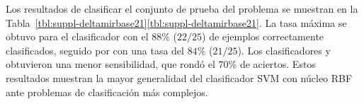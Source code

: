 %

Los resultados de clasificar el conjunto de prueba del problema
\prob\deltamirbase{} se muestran en la
\iflatexml{}Tabla~\ref{tbl:suppl-deltamirbase21}\else\autoref{tbl:suppl-deltamirbase21}\fi.
La tasa máxima se obtuvo para el clasificador  con el
$88\%$ ($22/25$) de ejemplos correctamente clasificados, seguido por
 con una tasa del $84\%$ ($21/25$).
Los clasificadores  y  obtuvieron una menor
sensibilidad, que rondó el $70\%$ de aciertos.
Estos resultados muestran la mayor generalidad del clasificador SVM
con núcleo RBF ante problemas de clasificación más complejos.
